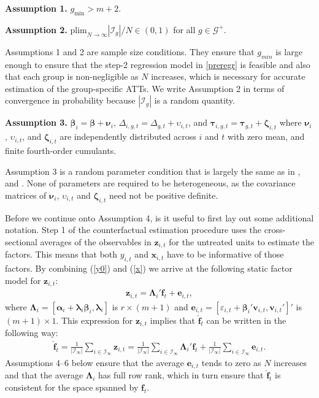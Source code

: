 \documentclass[12pt,fleqn]{article}
\def\*#1{\mathbf{#1}}
\def\+#1{\boldsymbol{#1}}
\begin{document}
\bigskip

\noindent \textbf{Assumption 1.} $g_{\min} > m+2$.

\bigskip

\noindent \textbf{Assumption 2.} $\mathrm{plim}_{N\to\infty} |\mathcal{I}_g|/N \in (0,1)$ for all $g \in \mathcal{G}^+$.

\bigskip

Assumptions 1 and 2 are sample size conditions. They ensure that $g_{min}$ is large enough to ensure that the step-2 regression model in \eqref{preregr} is feasible and also that each group is non-negligible as $N$ increases, which is necessary for accurate estimation of the group-specific ATTs. We write Assumption 2 in terms of convergence in probability because $|\mathcal{I}_g|$ is a random quantity.

\bigskip

\noindent \textbf{Assumption 3.} $\+\beta_{i} = \+\beta + \+\nu_i$, $\Delta_{i,g,t}= \Delta_{g,t} + \upsilon_{i,t}$, and $\+\tau_{i,g,t} = \+\tau_{g,t} + \+\zeta_{i,t}$ where $\+\nu_i$, $\upsilon_{i,t}$, and $\+\zeta_{i,t}$ are independently distributed across $i$ and $t$ with zero mean, and finite fourth-order cumulants.

\bigskip

Assumption 3 is a random parameter condition that is largely the same as in \citet{chan2022pcdid}, and \citet{Gobillon_Magnac_2016}. None of parameters are required to be heterogeneous, as the covariance matrices of $\+\nu_i$, $\upsilon_{i,t}$ and $\+\zeta_{i,t}$ need not be positive definite.

Before we continue onto Assumption 4, is it useful to first lay out some additional notation. Step 1 of the counterfactual estimation procedure uses the cross-sectional averages of the observables in $\*z_{i,t}$ for the untreated units to estimate the factors. This means that both $y_{i,t}$ and $\*x_{i,t}$ have to be informative of those factors. By combining (\ref{y0}) and (\ref{x}) we arrive at the following static factor model for $\*z_{i,t}$:
\begin{align}
\*z_{i,t} = \+\Lambda_i'\*f_t + \*e_{i,t}, \label{z}
\end{align}
where $\+\Lambda_i = [\+\alpha_i +\+\lambda_i\+\beta_i, \+\lambda_i]$ is $r\times (m+1)$ and $\*e_{i,t} = [\varepsilon_{i,t} + \+\beta_i'\*v_{i,t}, \*v_{i,t}']'$ is $(m+1)\times 1$. This expression for $\*z_{i,t}$ implies that $\widehat{\*f}_t$ can be written in the following way:
\begin{align}
\widehat{\*f}_t = \frac{1}{|\mathcal{I}_{\infty}|}\sum_{i \in \mathcal{I}_{\infty}} \*z_{i,t} = \frac{1}{|\mathcal{I}_{\infty}|}\sum_{i \in \mathcal{I}_{\infty}} \+\Lambda_i'\*f_t + \frac{1}{|\mathcal{I}_{\infty}|}\sum_{i \in \mathcal{I}_{\infty}} \*e_{i,t}.
\end{align}
Assumptions 4--6 below ensure that the average $\*e_{i,t}$ tends to zero as $N$ increases and that the average $\+\Lambda_i$ has full row rank, which in turn ensure that $\widehat{\*f}_t$ is consistent for the space spanned by $\*f_t$.
\end{document}
